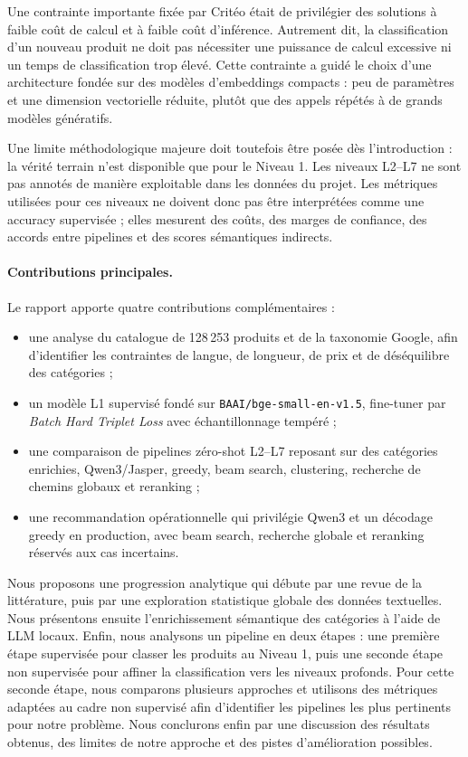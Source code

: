 \documentclass[12pt,a4paper]{report}
\begin{document}
Une contrainte importante fixée par Critéo était de privilégier des solutions à faible coût de calcul et à faible coût d'inférence. Autrement dit, la classification d'un nouveau produit ne doit pas nécessiter une puissance de calcul excessive ni un temps de classification trop élevé. Cette contrainte a guidé le choix d'une architecture fondée sur des modèles d'embeddings compacts : peu de paramètres et une dimension vectorielle réduite, plutôt que des appels répétés à de grands modèles génératifs.

Une limite méthodologique majeure doit toutefois être posée dès l'introduction : la vérité terrain n'est disponible que pour le Niveau 1. Les niveaux L2--L7 ne sont pas annotés de manière exploitable dans les données du projet. Les métriques utilisées pour ces niveaux ne doivent donc pas être interprétées comme une accuracy supervisée ; elles mesurent des coûts, des marges de confiance, des accords entre pipelines et des scores sémantiques indirects.

\paragraph{Contributions principales.}
Le rapport apporte quatre contributions complémentaires :
\begin{itemize}[leftmargin=1.2cm]
    \item une analyse du catalogue de 128\,253 produits et de la taxonomie Google, afin d'identifier les contraintes de langue, de longueur, de prix et de déséquilibre des catégories ;
    \item un modèle L1 supervisé fondé sur \texttt{BAAI/bge-small-en-v1.5}, fine-tuner par \textit{Batch Hard Triplet Loss} avec échantillonnage tempéré ;
    \item une comparaison de pipelines zéro-shot L2--L7 reposant sur des catégories enrichies, Qwen3/Jasper, greedy, beam search, clustering, recherche de chemins globaux et reranking ;
    \item une recommandation opérationnelle qui privilégie Qwen3 et un décodage greedy en production, avec beam search, recherche globale et reranking réservés aux cas incertains.
\end{itemize}

Nous proposons une progression analytique qui débute par une revue de la littérature, puis par une exploration statistique globale des données textuelles.
Nous présentons ensuite l'enrichissement sémantique des catégories à l'aide de LLM locaux.
Enfin, nous analysons un pipeline en deux étapes : une première étape supervisée pour classer les produits au Niveau 1, puis une seconde étape non supervisée pour affiner la classification vers les niveaux profonds.
Pour cette seconde étape, nous comparons plusieurs approches et utilisons des métriques adaptées au cadre non supervisé afin d'identifier les pipelines les plus pertinents pour notre problème.
Nous conclurons enfin par une discussion des résultats obtenus, des limites de notre approche et des pistes d'amélioration possibles.
\end{document}
